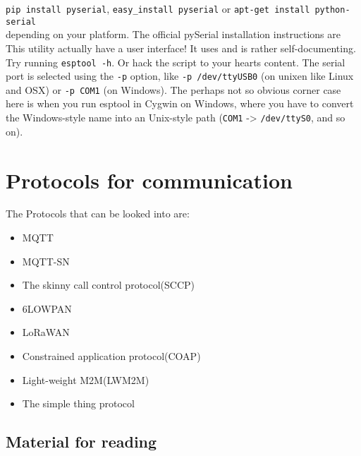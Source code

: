\documentclass[16pt]{article}
\begin{document}
\texttt{pip install pyserial},
\texttt{easy\_install pyserial} or
\texttt{apt-get install python-serial} \\
\vspace{0.3cm}
depending on your platform. The
official pySerial installation instructions are
This utility actually have a user interface! It uses
and is rather self-documenting. Try running \texttt{esptool -h}. Or hack the
script to your hearts content. The serial port is selected using the
\texttt{-p} option, like \texttt{-p /dev/ttyUSB0} (on unixen like Linux
and OSX) or \texttt{-p COM1} (on Windows). The perhaps not so obvious
corner case here is when you run esptool in Cygwin on Windows, where you
have to convert the Windows-style name into an Unix-style path
(\texttt{COM1} -\textgreater{} \texttt{/dev/ttyS0}, and so on).

\vspace{9cm}


\section{Protocols for communication}

\vspace{0.5cm}

The Protocols that can be looked into are:

\begin{itemize}

\item
  MQTT
\item
  MQTT-SN
\item
  The skinny call control protocol(SCCP)
\item
  6LOWPAN
\item
  LoRaWAN
\item
  Constrained application protocol(COAP)
\item
  Light-weight M2M(LWM2M)
\item
  The simple thing protocol
\end{itemize}

\subsection{Material for reading}
\end{document}
